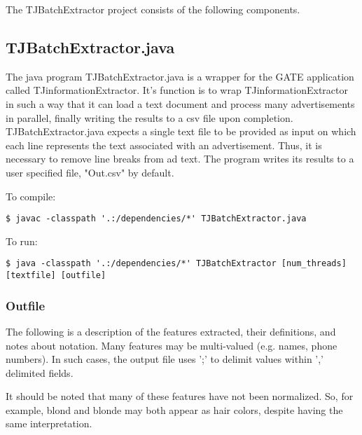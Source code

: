 \documentclass{article}
\begin{document}
The {TJBatchExtractor} project consists of the following components.

\subsection{{TJBatchExtractor.java}}

The java program {TJBatchExtractor.java} is a wrapper for the {GATE}
application called {TJinformationExtractor}. It's function is to wrap
{TJinformationExtractor} in such a way that it can load a text document and
process many advertisements in parallel, finally writing the results to
a csv file upon completion. {TJBatchExtractor.java} expects a single text
file to be provided as input on which each line represents the text associated
with an advertisement. Thus, it is necessary to remove line breaks from ad text.
The program writes its results to a user specified file, "Out.csv" by default.

To compile: 
\begin{lstlisting}[style=Bash]
$ javac -classpath '.:/dependencies/*' TJBatchExtractor.java
\end{lstlisting}

To run:
\begin{lstlisting}[style=Bash]
$ java -classpath '.:/dependencies/*' TJBatchExtractor [num_threads] [textfile] [outfile]
\end{lstlisting}

\subsubsection{Outfile}

The following is a description of the features extracted,
their definitions, and notes about notation. Many features
may be multi-valued (e.g. names, phone numbers). 
In such cases, the output file uses ';' to 
delimit values within ',' delimited fields.

It should be noted that many of these features have not been
normalized. So, for example, blond and blonde may both 
appear as hair colors, despite having the same interpretation.
\end{document}
